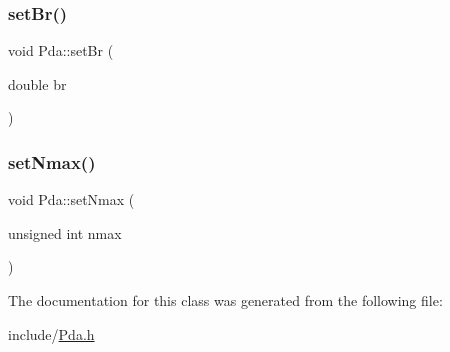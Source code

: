 \mbox{\label{class_pda_a8890b9df42265440d7ce534bb8a95887}} 
\subsubsection{\texorpdfstring{set\+Br()}{setBr()}}
{\footnotesize\ttfamily void Pda\+::set\+Br (\begin{DoxyParamCaption}\item[{double}]{br }\end{DoxyParamCaption})}

\mbox{\label{class_pda_a76f55e8d719aaace0f26ed1b47ed0bb4}} 
\subsubsection{\texorpdfstring{set\+Nmax()}{setNmax()}}
{\footnotesize\ttfamily void Pda\+::set\+Nmax (\begin{DoxyParamCaption}\item[{unsigned int}]{nmax }\end{DoxyParamCaption})}



The documentation for this class was generated from the following file\+:\begin{DoxyCompactItemize}
\item 
include/\hyperlink{_pda_8h}{Pda.\+h}\end{DoxyCompactItemize}
